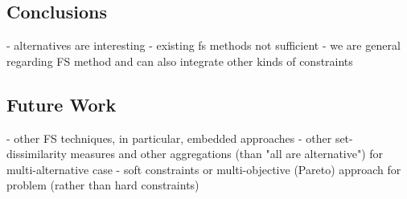 \documentclass{article}
\theoremstyle{definition}
\begin{document}
\subsection{Conclusions}

- alternatives are interesting
- existing fs methods not sufficient
- we are general regarding FS method and can also integrate other kinds of constraints

\subsection{Future Work}

- other FS techniques, in particular, embedded approaches
- other set-dissimilarity measures and other aggregations (than "all are alternative") for multi-alternative case
- soft constraints or multi-objective (Pareto) approach for problem (rather than hard constraints)

\printbibliography
\end{document}
